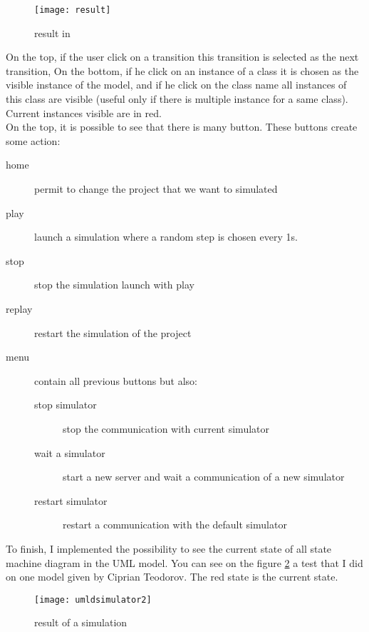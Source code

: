 \begin{figure}[h]
  \centering
  \texttt{[image: result]}
  \caption{result in \umld}
  \label{fig:result}
\end{figure}

On the top, if the user click on a transition this transition is selected as the next transition, On the bottom, if he click on an instance of a class it is chosen as the visible instance of the model, and if he click on the class name all instances of this class are visible (useful only if there is multiple instance for a same class). Current instances visible are in red.
~\\

On the top, it is possible to see that there is many button. These buttons create some action:

\noitemsep
\begin{description}
\item[home] permit to change the project that we want to simulated
\item[play] launch a simulation where a random step is chosen every 1s.
\item[stop] stop the simulation launch with play
\item[replay] restart the simulation of the project
\item[menu] contain all previous buttons but also:
  \begin{description}
  \item[stop simulator] stop the communication with current simulator
  \item[wait a simulator] start a new server and wait a communication of a new simulator
  \item[restart simulator] restart a communication with the default simulator
  \end{description}
\end{description}
\doitemsep


To finish, I implemented the possibility to see the current state of all state machine diagram in the UML model. You can see on the figure \ref{fig:result2} a test that I did on one model given by Ciprian Teodorov. The red state is the current state.

\begin{figure}[h]
  \centering
  \texttt{[image: umldsimulator2]}
  \caption{result of a simulation}
  \label{fig:result2}
\end{figure}

~\\

